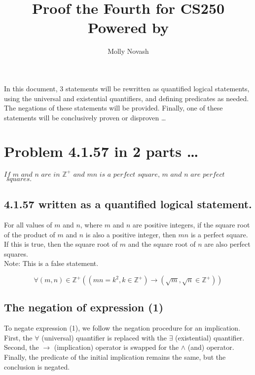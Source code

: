 \documentclass[12pt]{article}
\author{Molly Novash}
\title{%
\Huge Proof the Fourth for CS250  \\
\normalsize Powered by \LaTeXe}
\begin{document}
\sloppy
\maketitle
\bigskip

In this document, 3 statements will be rewritten as quantified logical statements, using the universal and existential quantifiers, and defining predicates as needed. The negations of these statements will be provided. Finally, one of these statements will be conclusively proven or disproven \ldots

\section{Problem 4.1.57 in 2 parts \ldots} 
\bigskip
$\textit{If $m$ and $n$ are in $\mathbb{Z}^+$ and $mn$ is a perfect square, $m$ and $n$ are perfect}$
$\textit{ squares.}$

\subsection{4.1.57 written as a quantified logical statement.}
\bigskip


For all values of $m$ and $n$, where $m$ and $n$ are positive integers, if the square root of the product of $m$ and $n$ is also a positive integer, then $mn$ is a perfect square. If this is true, then the square root of $m$ and the square root of $n$ are also perfect squares. \\

Note: This is a false statement.

\begin{equation}
\forall (m,n) \in \mathbb{Z}^+ ((mn = k^2, k \in \mathbb{Z}^+) \rightarrow (\sqrt{m}, \sqrt{n} \in \mathbb{Z}^+))
\end{equation}

\bigskip
\subsection{The negation of expression (1)}
\bigskip

To negate expression (1), we follow the negation procedure for an implication. First, the $\forall$ (universal) quantifier is replaced with the $\exists$ (existential) quantifier. Second, the $\rightarrow$ (implication) operator is swapped for the $\land$ (and) operator. Finally, the predicate of the initial implication remains the same, but the conclusion is negated. \\
\end{document}
